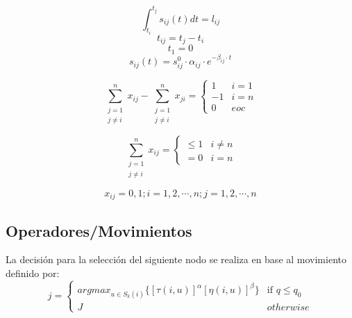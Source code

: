 \begin{equation}\label{7}
  \int_{t_i}^{t_j} s_{ij}(t)dt = l_{ij}
\end{equation}
\begin{equation}\label{8}
  t_{ij} = t_j - t_i
\end{equation}
\begin{equation}\label{9}
t_1 =0
\end{equation}
\begin{equation}\label{speed}
  s_{ij}(t) = s_{ij}^0 \cdot \alpha_{ij} \cdot e^{-\beta_{ij}\cdot t}
\end{equation}

\begin{equation}\label{full}
	\sum_{\substack{j=1\\
                  j \neq i}}^n x_{ij} - \sum_{\substack{j=1\\
                  j \neq i}}^{n} x_{ji} = \begin{cases}
1 & i=1\\
-1 & i=n \\
0 & eoc
\end{cases}
\end{equation}



\begin{equation}\label{circles}
	\sum_{\substack{j=1\\
                  j \neq i}}^n x_{ij} = \begin{cases}
\leq 1 & i\neq n\\
=0 & i=n 
\end{cases}
\end{equation}

\begin{equation}
	x_{ij} = 0,1;i=1,2,\cdots,n;j=1,2,\cdots,n
\end{equation}
\subsection{Operadores/Movimientos}
La decisión para la selección del siguiente nodo se realiza en base al movimiento  definido por:
\begin{equation}
j = \begin{cases} arg max_{u \in S_{k}(i)} \{ [\tau(i,u)]^\alpha [\eta(i,u)]^\beta\} &\mbox{if } q \leq q_0 \\ 
J & otherwise \end{cases} 
\end{equation}

